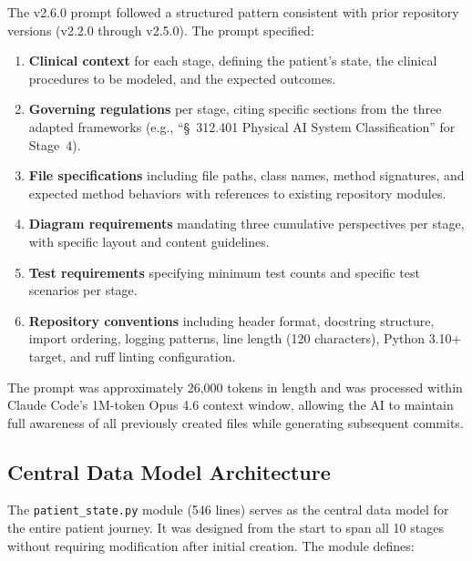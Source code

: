 \documentclass{article}
\begin{document}
The v2.6.0 prompt followed a structured pattern consistent with prior repository versions (v2.2.0 through v2.5.0). The prompt specified:

\begin{enumerate}[leftmargin=*]
\item \textbf{Clinical context} for each stage, defining the patient's state, the clinical procedures to be modeled, and the expected outcomes.
\item \textbf{Governing regulations} per stage, citing specific sections from the three adapted frameworks (e.g., ``\S~312.401 Physical AI System Classification'' for Stage~4).
\item \textbf{File specifications} including file paths, class names, method signatures, and expected method behaviors with references to existing repository modules.
\item \textbf{Diagram requirements} mandating three cumulative perspectives per stage, with specific layout and content guidelines.
\item \textbf{Test requirements} specifying minimum test counts and specific test scenarios per stage.
\item \textbf{Repository conventions} including header format, docstring structure, import ordering, logging patterns, line length (120 characters), Python 3.10+ target, and ruff linting configuration.
\end{enumerate}

The prompt was approximately 26,000 tokens in length and was processed within Claude Code's 1M-token Opus 4.6 context window, allowing the AI to maintain full awareness of all previously created files while generating subsequent commits.

\subsection{Central Data Model Architecture}

The \texttt{patient\_state.py} module (546 lines) serves as the central data model for the entire patient journey. It was designed from the start to span all 10 stages without requiring modification after initial creation. The module defines:
\end{document}

